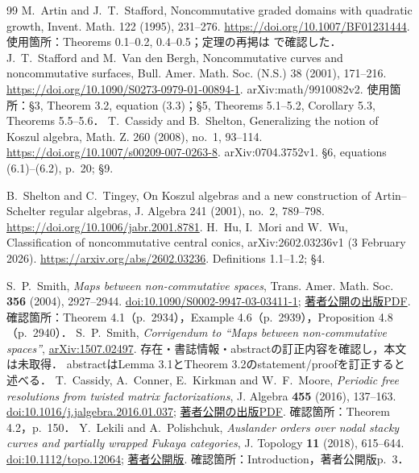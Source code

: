 \documentclass[11pt,a4paper]{ltjsarticle}
\begin{document}
\begin{thebibliography}{99}
 M.~Artin and J.~T.~Stafford,
Noncommutative graded domains with quadratic growth,
Invent. Math. 122 (1995), 231--276.
\url{https://doi.org/10.1007/BF01231444}.
使用箇所：Theorems 0.1--0.2, 0.4--0.5；定理の再掲は
\cite[Theorems 5.1--5.2, 5.5--5.6]{SVdBsurvey}で確認した．
 J.~T.~Stafford and M.~Van den Bergh,
Noncommutative curves and noncommutative surfaces,
Bull. Amer. Math. Soc. (N.S.) 38 (2001), 171--216.
\url{https://doi.org/10.1090/S0273-0979-01-00894-1}.
arXiv:math/9910082v2.
使用箇所：\S3, Theorem 3.2, equation (3.3)；\S5, Theorems 5.1--5.2, Corollary 5.3, Theorems 5.5--5.6．
 T.~Cassidy and B.~Shelton,
Generalizing the notion of Koszul algebra,
Math. Z. 260 (2008), no.~1, 93--114.
\url{https://doi.org/10.1007/s00209-007-0263-8}.
arXiv:0704.3752v1.
\S6, equations (6.1)--(6.2), p.~20; \S9.


 B.~Shelton and C.~Tingey,
On Koszul algebras and a new construction of Artin--Schelter regular algebras,
J. Algebra 241 (2001), no.~2, 789--798.
\url{https://doi.org/10.1006/jabr.2001.8781}.
 H.~Hu, I.~Mori and W.~Wu,
Classification of noncommutative central conics,
arXiv:2602.03236v1 (3 February 2026).
\url{https://arxiv.org/abs/2602.03236}.
Definitions 1.1--1.2; \S4.

 S.~P.~Smith,
\emph{Maps between non-commutative spaces},
Trans. Amer. Math. Soc. \textbf{356} (2004), 2927--2944.
\href{https://doi.org/10.1090/S0002-9947-03-03411-1}{doi:10.1090/S0002-9947-03-03411-1};
\href{https://sites.math.washington.edu/~smith/Research/Maps.pdf}{著者公開の出版PDF}.
確認箇所：Theorem 4.1（p.~2934），Example 4.6（p.~2939），Proposition 4.8（p.~2940）．
 S.~P.~Smith,
\emph{Corrigendum to ``Maps between non-commutative spaces''},
\href{https://arxiv.org/abs/1507.02497}{arXiv:1507.02497}.
存在・書誌情報・abstractの訂正内容を確認し，本文は未取得．
abstractはLemma 3.1とTheorem 3.2のstatement/proofを訂正すると述べる．
 T.~Cassidy, A.~Conner, E.~Kirkman and W.~F.~Moore,
\emph{Periodic free resolutions from twisted matrix factorizations},
J. Algebra \textbf{455} (2016), 137--163.
\href{https://doi.org/10.1016/j.jalgebra.2016.01.037}{doi:10.1016/j.jalgebra.2016.01.037};
\href{https://users.wfu.edu/moorewf/Papers/twistedMFs.pdf}{著者公開の出版PDF}.
確認箇所：Theorem 4.2，p.~150．
 Y.~Lekili and A.~Polishchuk,
\emph{Auslander orders over nodal stacky curves and partially wrapped Fukaya categories},
J. Topology \textbf{11} (2018), 615--644.
\href{https://doi.org/10.1112/topo.12064}{doi:10.1112/topo.12064};
\href{https://lekili.freemath.xyz/research/pwrap.pdf}{著者公開版}.
確認箇所：Introduction，著者公開版p.~3．


\end{thebibliography}
\end{document}
